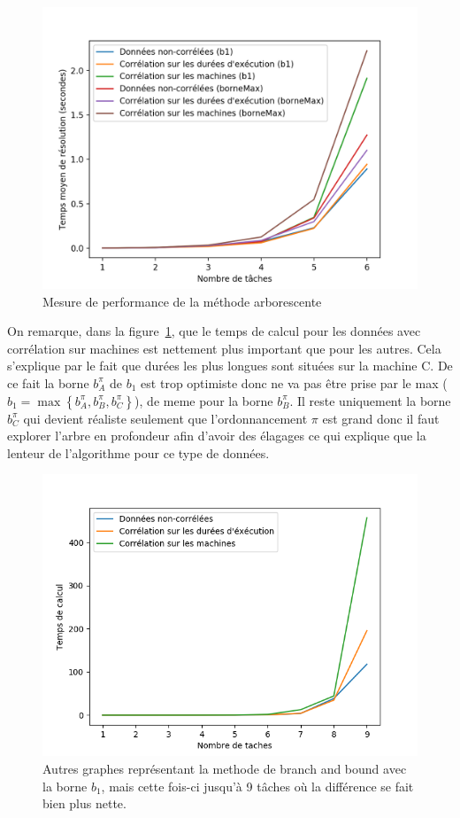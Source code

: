 \documentclass[a4paper, 10pt]{article}
\begin{document}
		\begin{figure}[h]
			\centering
			\includegraphics[width=0.85\linewidth]{graphes/time_exact_20iter_b1bmax.png}
			\caption{Mesure de performance de la méthode arborescente}
			\label{fig:temps_exact}
		\end{figure}
		
	        On remarque, dans la figure~\ref{fig:temps_exact}, que le temps de calcul pour les données avec corrélation sur machines est nettement plus important que pour les autres. Cela s'explique par le fait que durées les plus longues sont situées sur la machine C. De ce fait la borne $b^\pi_A$ de $b_1$ est trop optimiste donc ne va pas être prise par le max ($b_1 = \max\left\{b^\pi_A, b^\pi_B, b^\pi_C\right\}$), de meme pour la borne $b^\pi_B$. Il reste uniquement la borne $b^\pi_C$ qui devient réaliste seulement que l'ordonnancement $\pi$ est grand donc il faut explorer l'arbre en profondeur afin d'avoir des élagages ce qui explique que la lenteur de l'algorithme pour ce type de données.

        \begin{figure}[h]
			\centering
			\includegraphics[width=0.85\linewidth]{graphes/b1.png}
			\caption{Autres graphes représentant la methode de branch and bound avec la borne $b_1$, mais cette fois-ci jusqu'à 9 tâches où la différence se fait bien plus nette.}
			\label{fig:b1}
		\end{figure}
		
\end{document}
